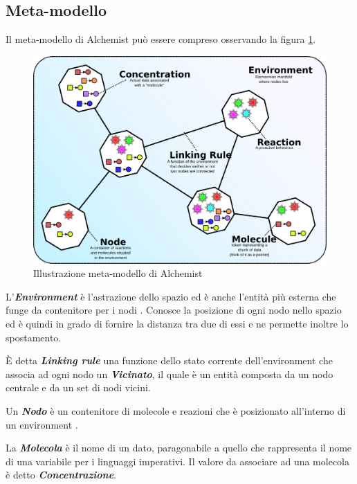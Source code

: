 \subsection{Meta-modello}
Il meta-modello di Alchemist può essere compreso osservando la figura \ref{fig:alchemistModel}.
\begin{figure} %
\begin{center} %
\includegraphics[width=12.5cm]{images/AlchemistModel.png} %
\caption[Illustrazione meta-modello di Alchemist]{Illustrazione meta-modello di Alchemist} \label{fig:alchemistModel}
\end{center}
\end{figure}

L'\textbf{\textit{Environment}} è l'astrazione dello spazio ed è anche l'entità più esterna che funge da contenitore per i nodi \cite{Alchemist}. Conosce la posizione di ogni nodo nello spazio ed è quindi in grado di fornire la distanza tra due di essi e ne permette inoltre lo spostamento.

È detta \textbf{\textit{Linking rule}} una funzione dello stato corrente dell'environment che associa ad ogni nodo un \textbf{\textit{Vicinato}}, il quale è un entità composta da un nodo centrale e da un set di nodi vicini.

Un \textbf{\textit{Nodo}} è un contenitore di molecole e reazioni che è posizionato all'interno di un environment \cite{Alchemist}.

La \textbf{\textit{Molecola}} è il nome di un dato, paragonabile a quello che rappresenta il nome di una variabile per i linguaggi imperativi.
Il valore da associare ad una molecola è detto \textbf{\textit{Concentrazione}}.

